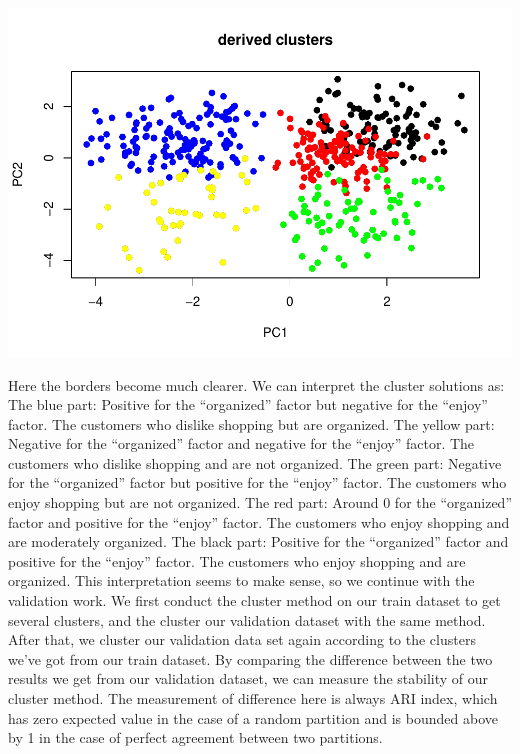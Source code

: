 \documentclass[
  11pt,
]{article}
\begin{document}
\includegraphics{report_files/figure-latex/Task_3_90-1.pdf}

Here the borders become much clearer. We can interpret the cluster solutions as:
The blue part: Positive for the ``organized'' factor but negative for the ``enjoy'' factor. The customers who dislike shopping but are organized.
The yellow part: Negative for the ``organized'' factor and negative for the ``enjoy'' factor. The customers who dislike shopping and are not organized.
The green part: Negative for the ``organized'' factor but positive for the ``enjoy'' factor. The customers who enjoy shopping but are not organized.
The red part: Around 0 for the ``organized'' factor and positive for the ``enjoy'' factor. The customers who enjoy shopping and are moderately organized.
The black part: Positive for the ``organized'' factor and positive for the ``enjoy'' factor. The customers who enjoy shopping and are organized.
This interpretation seems to make sense, so we continue with the validation work. We first conduct the cluster method on our train dataset to get several clusters, and the cluster our validation dataset with the same method. After that, we cluster our validation data set again according to the clusters we've got from our train dataset. By comparing the difference between the two results we get from our validation dataset, we can measure the stability of our cluster method. The measurement of difference here is always ARI index, which has zero expected value in the case of a random partition and is bounded above by 1 in the case of perfect agreement between two partitions.
\end{document}
